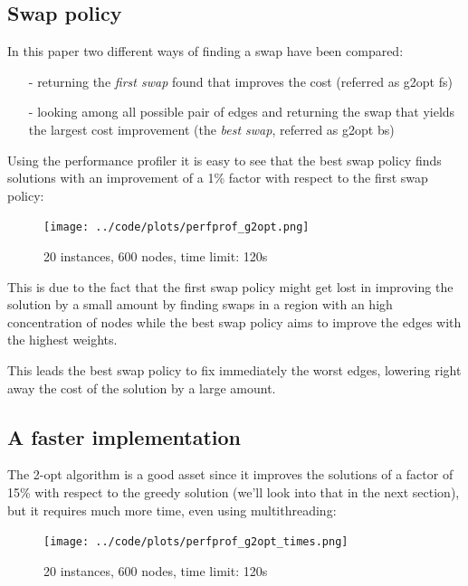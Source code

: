 \subsection{Swap policy}

In this paper two different ways of finding a swap have been compared:

\begin{enumerate}
    \item[-] returning the \textit{first swap} found that improves the cost (referred as g2opt fs)
    \item[-] looking among all possible pair of edges and returning the swap that yields the largest cost improvement (the \textit{best swap}, referred as g2opt bs)
\end{enumerate}

Using the performance profiler it is easy to see that the best swap policy finds solutions with an improvement of a 1\% factor with respect to the first swap policy:

\begin{figure}[h]
    \centering
    \texttt{[image: ../code/plots/perfprof\_g2opt.png]}
    \captionsetup{labelformat=empty}
    \caption*{20 instances, 600 nodes, time limit: 120s}
    \label{fig:eree}
\end{figure}

This is due to the fact that the first swap policy might get lost in improving the solution by a small amount by finding swaps in a region with an high concentration of nodes while the best swap policy aims to improve the edges with the highest weights.

This leads the best swap policy to fix immediately the worst edges, lowering right away the cost of the solution by a large amount.

\subsection{A faster implementation}

The 2-opt algorithm is a good asset since it improves the solutions of a factor of 15\% with respect to the greedy solution (we'll look into that in the next section), but it requires much more time, even using multithreading:
\begin{figure}[h]
    \centering
    \texttt{[image: ../code/plots/perfprof\_g2opt\_times.png]}
    \caption*{20 instances, 600 nodes, time limit: 120s}
\end{figure}

